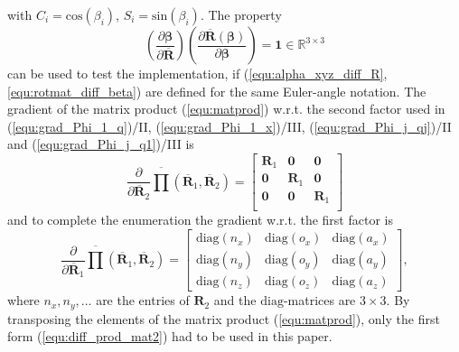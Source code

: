 \documentclass[robotics,article,submit,moreauthors,pdftex]{Definitions/mdpi}
\newcommand{\bm}[1]{\boldsymbol{#1}}
\begin{document}
%
with $C_i=\mathrm{cos}(\beta_i)$, $S_i=\mathrm{sin}(\beta_i)$.
The property
%
\begin{equation}
\left(\frac{\partial \bm{\beta}}{\partial \overline{\bm{R}}}\right)
\left(\frac{\partial \overline{\bm{R}}(\bm{\beta})}{\partial \bm{\beta}}\right)
=
\bm{1} \in {\mathbb{R}}^{3 \times 3}
\end{equation}
%
can be used to test the implementation, if (\ref{equ:alpha_xyz_diff_R}, \ref{equ:rotmat_diff_beta}) are defined for the same Euler-angle notation.
The gradient of the matrix product (\ref{equ:matprod}) w.r.t. the second factor used in (\ref{equ:grad_Phi_1_q})/II, (\ref{equ:grad_Phi_1_x})/III, (\ref{equ:grad_Phi_j_qj})/II and (\ref{equ:grad_Phi_j_q1})/III is
%
\begin{equation}
\frac{\partial }{\partial \overline{\bm{R}}_2}
\overline{\prod}\left( \overline{\bm{R}}_1, \overline{\bm{R}}_2\right)
=
\begin{bmatrix}
\bm{R}_1 & \bm{0} & \bm{0} \\
\bm{0} & \bm{R}_1 & \bm{0} \\
\bm{0} & \bm{0} & \bm{R}_1 \\
\end{bmatrix}
\label{equ:diff_prod_mat2}
\end{equation}
%
and to complete the enumeration the gradient w.r.t. the first factor is
%
\begin{equation}
\frac{\partial }{\partial \overline{\bm{R}}_1}
\overline{\prod}\left( \overline{\bm{R}}_1, \overline{\bm{R}}_2\right)
=
\begin{bmatrix}
{\mathrm{diag}}(n_x)&{\mathrm{diag}}(o_x)&{\mathrm{diag}}(a_x) \\ {\mathrm{diag}}(n_y)&{\mathrm{diag}}(o_y)&{\mathrm{diag}}(a_y)\\ {\mathrm{diag}}(n_z)&{\mathrm{diag}}(o_z)&{\mathrm{diag}}(a_z)
\end{bmatrix},
\label{equ:diff_prod_mat1}
\end{equation}
%
where $n_x,n_y,...$ are the entries of $\bm{R}_2$ and the $\mathrm{diag}$-matrices are $3 \times 3$.
By transposing the elements of the matrix product (\ref{equ:matprod}), only the first form (\ref{equ:diff_prod_mat2}) had to be used in this paper.


\end{document}
